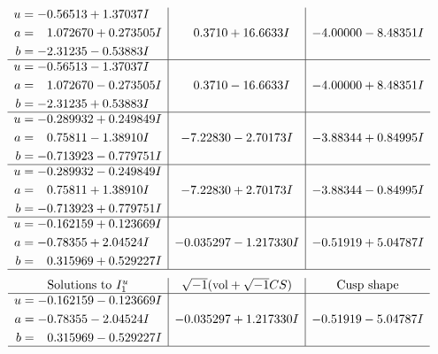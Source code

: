 \documentclass[1p]{elsarticle_modified}
\theoremstyle{definition}
\newcommand{\I}{\sqrt{-1}}
\begin{document}
$$\begin{array}{c|c|c}
\begin{aligned}
u &= -0.56513 + 1.37037 I \\
a &= \phantom{-}1.072670 + 0.273505 I \\
b &= -2.31235 - 0.53883 I\end{aligned}
 & \phantom{-}0.3710 + 16.6633 I & -4.00000 - 8.48351 I \\ \hline\begin{aligned}
u &= -0.56513 - 1.37037 I \\
a &= \phantom{-}1.072670 - 0.273505 I \\
b &= -2.31235 + 0.53883 I\end{aligned}
 & \phantom{-}0.3710 - 16.6633 I & -4.00000 + 8.48351 I \\ \hline\begin{aligned}
u &= -0.289932 + 0.249849 I \\
a &= \phantom{-}0.75811 - 1.38910 I \\
b &= -0.713923 - 0.779751 I\end{aligned}
 & -7.22830 - 2.70173 I & -3.88344 + 0.84995 I \\ \hline\begin{aligned}
u &= -0.289932 - 0.249849 I \\
a &= \phantom{-}0.75811 + 1.38910 I \\
b &= -0.713923 + 0.779751 I\end{aligned}
 & -7.22830 + 2.70173 I & -3.88344 - 0.84995 I \\ \hline\begin{aligned}
u &= -0.162159 + 0.123669 I \\
a &= -0.78355 + 2.04524 I \\
b &= \phantom{-}0.315969 + 0.529227 I\end{aligned}
 & -0.035297 - 1.217330 I & -0.51919 + 5.04787 I\\
 \hline 
 \end{array}$$\newpage$$\begin{array}{c|c|c}  
\text{Solutions to }I^u_{1}& \I (\text{vol} + \sqrt{-1}CS) & \text{Cusp shape}\\
 \hline 
\begin{aligned}
u &= -0.162159 - 0.123669 I \\
a &= -0.78355 - 2.04524 I \\
b &= \phantom{-}0.315969 - 0.529227 I\end{aligned}
 & -0.035297 + 1.217330 I & -0.51919 - 5.04787 I\\
 \hline 
 \end{array}$$\newpage\newpage\renewcommand{\arraystretch}{1}
\end{document}
